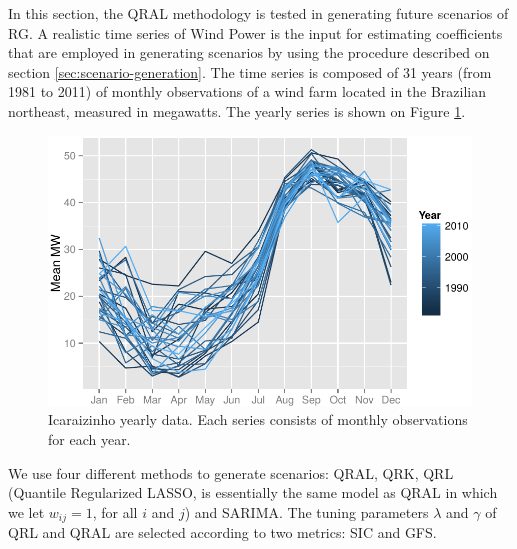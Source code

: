 In this section, the QRAL methodology is tested in generating future scenarios of RG. A realistic time series of Wind Power is the input for estimating coefficients that are employed in generating scenarios by using the procedure described on section \ref{sec:scenario-generation}.
The time series is composed of 31 years (from 1981 to 2011) of monthly observations  of a wind farm located in the Brazilian northeast, measured in megawatts. The yearly series is shown on Figure \ref{fig:icaraizinho-mensal}.
\begin{figure}[h]
\centering
\includegraphics[width=0.8\linewidth]{Images/icaraizinho-mensal2}
\caption{Icaraizinho yearly data. Each series consists of monthly observations for each year.}
\label{fig:icaraizinho-mensal}
\end{figure}

We use four different methods to generate scenarios:  QRAL, QRK, QRL (Quantile Regularized LASSO, is essentially the same model as QRAL in which we let $w_{ij} = 1$, for all $i$ and $j$) and SARIMA. 
The tuning parameters $\lambda$ and $\gamma$ of QRL and QRAL are selected according to two metrics: SIC and GFS.

